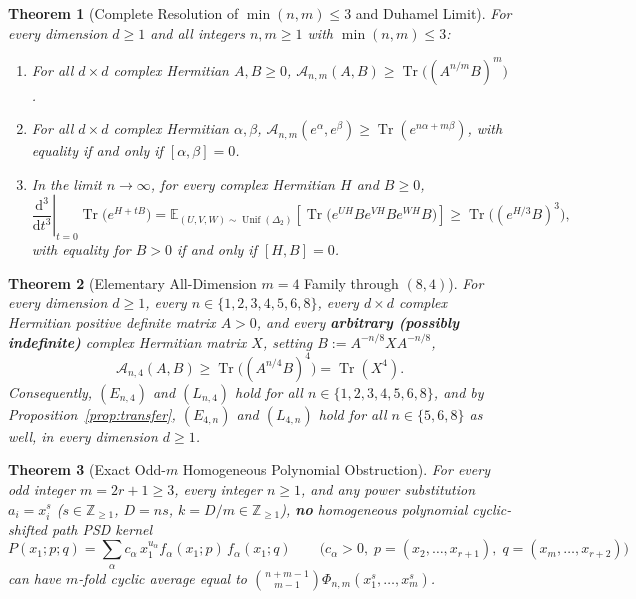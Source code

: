 \documentclass[11pt,a4paper]{article}
\newtheorem{theorem}{Theorem}[section]
\theoremstyle{remark}
\newcommand{\Tr}{\operatorname{Tr}}
\begin{document}
\begin{theorem}[Complete Resolution of $\min(n,m)\le 3$ and Duhamel Limit]\label{thm:min3}
For every dimension $d\ge 1$ and all integers $n,m\ge 1$ with $\min(n,m)\le 3$:
\begin{enumerate}
  \item For all $d\times d$ complex Hermitian $A,B\ge 0$, $\mathcal{A}_{n,m}(A,B) \ge \Tr\!\big((A^{n/m}B)^m\big)$.
  \item For all $d\times d$ complex Hermitian $\alpha,\beta$, $\mathcal{A}_{n,m}(e^\alpha,e^\beta)\ge\Tr(e^{n\alpha+m\beta})$, with equality if and only if $[\alpha,\beta]=0$.
  \item In the limit $n\to\infty$, for every complex Hermitian $H$ and $B\ge 0$,
  \[
    \left.\frac{\mathrm{d}^3}{\mathrm{d}t^3}\right|_{t=0}\Tr\!\big(e^{H+tB}\big)
    = \mathbb{E}_{(U,V,W)\sim\operatorname{Unif}(\Delta_2)}\!\left[\Tr\!\big(e^{UH}Be^{VH}Be^{WH}B\big)\right]
    \ge \Tr\!\big((e^{H/3}B)^3\big),
  \]
  with equality for $B>0$ if and only if $[H,B]=0$.
\end{enumerate}
\end{theorem}

\begin{theorem}[Elementary All-Dimension $m=4$ Family through $(8,4)$]\label{thm:m4_family}
For every dimension $d\ge 1$, every $n\in\{1,2,3,4,5,6,8\}$, every $d\times d$ complex Hermitian positive definite matrix $A>0$, and every \textbf{arbitrary (possibly indefinite)} complex Hermitian matrix $X$, setting $B := A^{-n/8} X A^{-n/8}$,
\begin{equation}\label{eq:En4}
  \mathcal{A}_{n,4}(A,B) \ge \Tr\!\big((A^{n/4}B)^4\big) = \Tr(X^4).
\end{equation}
Consequently, $(E_{n,4})$ and $(L_{n,4})$ hold for all $n\in\{1,2,3,4,5,6,8\}$, and by Proposition~\ref{prop:transfer}, $(E_{4,n})$ and $(L_{4,n})$ hold for all $n\in\{5,6,8\}$ as well, in every dimension $d\ge 1$.
\end{theorem}

\begin{theorem}[Exact Odd-$m$ Homogeneous Polynomial Obstruction]\label{thm:odd_obstruction}
For every odd integer $m=2r+1\ge 3$, every integer $n\ge 1$, and any power substitution $a_i = x_i^s$ ($s\in\mathbb{Z}_{\ge 1}$, $D=ns$, $k=D/m\in\mathbb{Z}_{\ge 1}$), \textbf{no} homogeneous polynomial cyclic-shifted path PSD kernel
\[
  P(x_1; p; q) = \sum_\alpha c_\alpha\, x_1^{u_\alpha} f_\alpha(x_1; p)\, f_\alpha(x_1; q) \qquad \big(c_\alpha > 0,\; p=(x_2,\dots,x_{r+1}),\; q=(x_m,\dots,x_{r+2})\big)
\]
can have $m$-fold cyclic average equal to $\binom{n+m-1}{m-1}\Phi_{n,m}(x_1^s,\dots,x_m^s)$.
\end{theorem}
\end{document}
